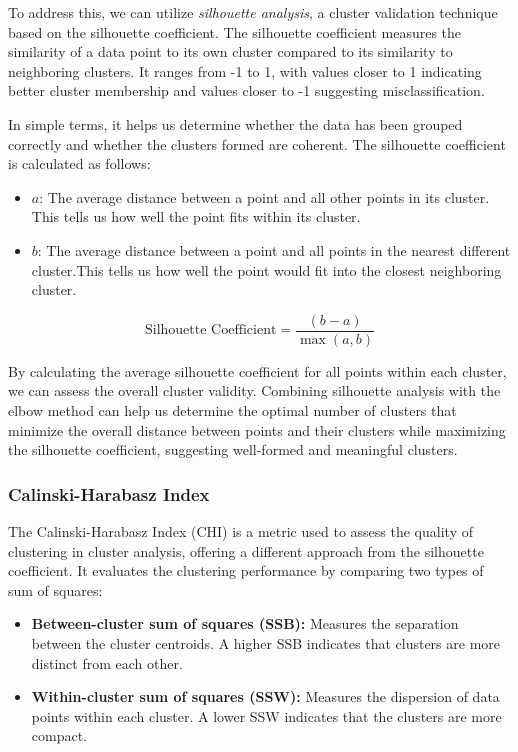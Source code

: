 \documentclass{llncs}
\begin{document}
To address this, we can utilize \textit{silhouette analysis}, a cluster validation technique based on the silhouette coefficient. The silhouette coefficient measures the similarity of a data point to its own cluster compared to its similarity to neighboring clusters. It ranges from -1 to 1, with values closer to 1 indicating better cluster membership and values closer to -1 suggesting misclassification.\cite{Wang2018Thresher}


In simple terms, it helps us determine whether the data has been grouped correctly and whether the clusters formed are coherent.
The silhouette coefficient is calculated as follows:

\begin{itemize}
	\item \(a\): The average distance between a point and all other points in its cluster. This tells us how well the point fits within its cluster.
	\item \(b\): The average distance between a point and all points in the nearest different cluster.This tells us how well the point would fit into the closest neighboring cluster.
\end{itemize}

\[
\text{Silhouette Coefficient} = \frac{(b - a)}{\max(a, b)}
\]

By calculating the average silhouette coefficient for all points within each cluster, we can assess the overall cluster validity. Combining silhouette analysis with the elbow method can help us determine the optimal number of clusters that minimize the overall distance between points and their clusters while maximizing the silhouette coefficient, suggesting well-formed and meaningful clusters.\cite{Wang2018Thresher}

\subsubsection{Calinski-Harabasz Index}


The Calinski-Harabasz Index (CHI) is a metric used to assess the quality of clustering in cluster analysis, offering a different approach from the silhouette coefficient. It evaluates the clustering performance by comparing two types of sum of squares:\cite{Ning2023Clustering}

\begin{itemize}
	\item \textbf{Between-cluster sum of squares (SSB):} Measures the separation between the cluster centroids. A higher SSB indicates that clusters are more distinct from each other.
	\item \textbf{Within-cluster sum of squares (SSW):} Measures the dispersion of data points within each cluster. A lower SSW indicates that the clusters are more compact.
\end{itemize}
\end{document}
